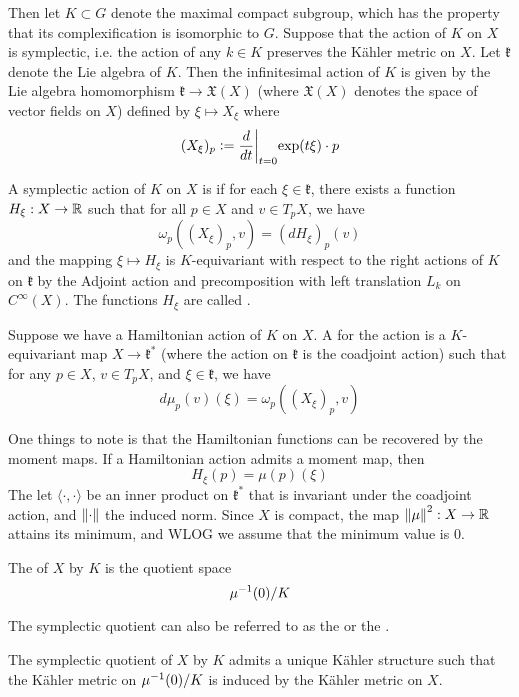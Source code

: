Then let $K \subset G$ denote the maximal compact subgroup, which has the
property that its complexification is isomorphic to $G$. Suppose that
the action of $K$ on $X$ is symplectic, i.e. the action of any $k \in K$
preserves the K\"ahler metric on $X$. Let $\mathfrak{k}$ denote the
Lie algebra of $K$. Then the infinitesimal action of $K$ is given by
the Lie algebra homomorphism $\mathfrak{k} \to \mathfrak{X}(X)$ (where
$\mathfrak{X}(X)$ denotes the space of vector fields on $X$) defined by
$\xi \mapsto X_\xi$ where
\[
(X_\xi)_p \vcentcolon= \frac{d}{dt}\bigg\vert_{t=0}\mathrm{exp}(t\xi)\cdot p
\]
\begin{defn}
A symplectic action of $K$ on $X$ is  if for each
$\xi \in \mathfrak{k}$, there exists a function $H_\xi : X \to \mathbb{R}$
such that for all $p \in X$ and $v \in T_pX$, we have
\[
\omega_p((X_\xi)_p,v) = (dH_\xi)_p(v)
\]
and the mapping $\xi \mapsto H_\xi$ is $K$-equivariant with respect
to the right actions of $K$ on $\mathfrak{k}$ by the Adjoint action
and precomposition with left translation $L_k$ on $C^\infty(X)$. The
functions $H_\xi$ are called .
\end{defn}
%
\begin{defn}
Suppose we have a Hamiltonian action of $K$ on $X$. A 
for the action is a $K$-equivariant map $X \to \mathfrak{k}^*$ (where the
action on $\mathfrak{k}$ is the coadjoint action) such
that for any $p \in X$, $v \in T_pX$, and $\xi \in \mathfrak{k}$, we have
\[
d\mu_p(v)(\xi) = \omega_p((X_\xi)_p,v)
\]
\end{defn}
%
One things to note is that the Hamiltonian functions can be
recovered by the moment maps. If a Hamiltonian action admits a moment map,
then
\[
H_\xi(p) = \mu(p)(\xi)
\]
The let $\langle\cdot,\cdot\rangle$ be an inner product on $\mathfrak{k}^*$
that is invariant under the coadjoint action, and $\left\lVert\cdot\right\rVert$ the induced
norm. Since $X$ is compact, the map $\left\lVert\mu\right\rVert^2 : X \to \mathbb{R}$ attains
its minimum, and WLOG we assume that the minimum value is $0$.
%
\begin{defn}
The  of $X$ by $K$ is the quotient space
\[
\mu^{-1}(0)/K
\]
\end{defn}
%
The symplectic quotient can also be referred to as the 
or the .
%
\begin{thm}
The symplectic quotient of $X$ by $K$ admits a unique K\"ahler structure
such that the K\"ahler metric on $\mu^{-1}(0)/K$ is induced by the K\"ahler
metric on $X$.
\end{thm}
